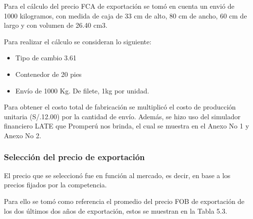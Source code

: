 \documentclass[
  stu,
  floatsintext,
  longtable,
  a4paper,
  nolmodern,
  notxfonts,
  notimes,
  colorlinks=true,linkcolor=blue,citecolor=blue,urlcolor=blue]{apa7}
\providecommand{\tightlist}{%
  \setlength{\itemsep}{0pt}\setlength{\parskip}{0pt}}
\begin{document}
Para el cálculo del precio FCA de exportación se tomó en cuenta un envió
de 1000 kilogramos, con medida de caja de 33 cm de alto, 80 cm de ancho,
60 cm de largo y con volumen de 26.40 cm3.

Para realizar el cálculo se consideran lo siguiente:

\begin{itemize}
\tightlist
\item
  \hspace{0pt} Tipo de cambio 3.61
\item
  \hspace{0pt} Contenedor de 20 pies
\item
  \hspace{0pt} Envío de 1000 Kg. De filete, 1kg por unidad.
\end{itemize}

Para obtener el costo total de fabricación se multiplicó el costo de
producción unitaria (S/.12.00) por la cantidad de envío. Además, se hizo
uso del simulador financiero LATE que Promperú nos brinda, el cual se
muestra en el Anexo No 1 y Anexo No 2.

\subsubsection{Selección del precio de
exportación}\label{selecciuxf3n-del-precio-de-exportaciuxf3n}

El precio que se seleccionó fue en función al mercado, es decir, en base
a los precios fijados por la competencia.

Para ello se tomó como referencia el promedio del precio FOB de
exportación de los dos últimos dos años de exportación, estos se
muestran en la Tabla 5.3.
\end{document}
